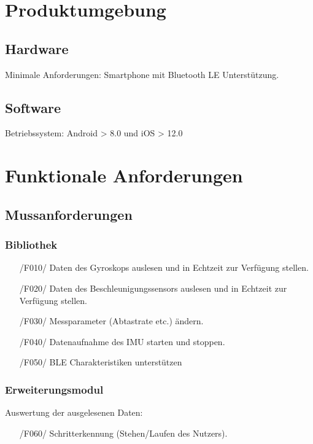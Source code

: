 \documentclass[a4paper,12pt]{article}
\begin{document}
\section{Produktumgebung}
\subsection{Hardware} \textsf{Minimale Anforderungen:} Smartphone mit Bluetooth LE Unterstützung.
\subsection{Software} \textsf{Betriebssystem:} Android > 8.0 und iOS > 12.0

\section{Funktionale Anforderungen}

  \subsection{Mussanforderungen}
    \subsubsection{Bibliothek}
    \begin{itemize}
      \item[/F010/] Daten des Gyroskops auslesen und in Echtzeit zur Verfügung stellen.
      \item[/F020/] Daten des Beschleunigungssensors auslesen und in Echtzeit zur Verfügung stellen.
      \item[/F030/] Messparameter (Abtastrate etc.) ändern. %
      \item[/F040/] Datenaufnahme des IMU starten und stoppen.
      \item[/F050/] BLE Charakteristiken unterstützen %
    \end{itemize}
    \subsubsection{Erweiterungsmodul}
     Auswertung der ausgelesenen Daten:
     \begin{itemize}
      \item[/F060/] Schritterkennung (Stehen/Laufen des Nutzers).
    \end{itemize}
\end{document}
